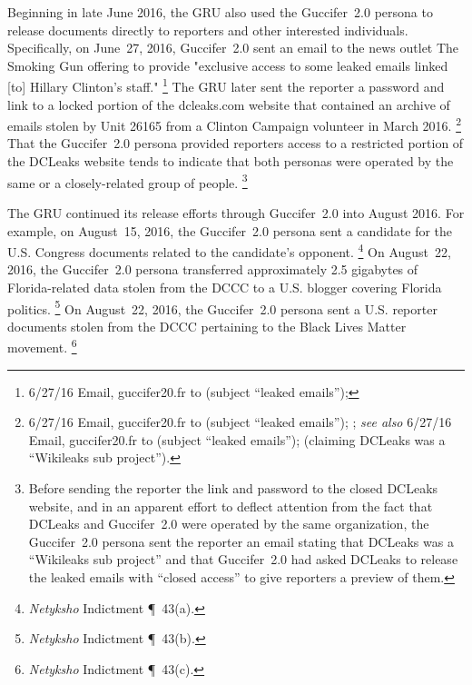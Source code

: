 Beginning in late June 2016, the GRU also used the Guccifer~2.0 persona to release documents directly to reporters and other interested individuals.
Specifically, on June~27, 2016, Guccifer~2.0 sent an email to the news outlet The Smoking Gun offering to provide "exclusive access to some leaked emails linked [to] Hillary Clinton's staff."%
\footnote{6/27/16 Email, guccifer20\@aol.fr to  (subject ``leaked emails''); }
The GRU later sent the reporter a password and link to a locked portion of the dcleaks.com website that contained an archive of emails stolen by Unit 26165 from a Clinton Campaign volunteer in March 2016.%
\footnote{6/27/16 Email, guccifer20\@aol.fr to  (subject ``leaked emails''); ;
\textit{see also} 6/27/16 Email, guccifer20\@aol.fr to  (subject ``leaked emails'');  (claiming DCLeaks was a ``Wikileaks sub project'').}
That the Guccifer~2.0 persona provided reporters access to a restricted portion of the DCLeaks website tends to indicate that both personas were operated by the same or a  closely-related group of people.%
\footnote{Before sending the reporter the link and password to the closed DCLeaks website, and in an apparent effort to deflect attention from the fact that DCLeaks and Guccifer~2.0 were operated by the same organization, the Guccifer~2.0 persona sent the reporter an email stating that DCLeaks was a ``Wikileaks sub project'' and that Guccifer~2.0 had asked DCLeaks to release the leaked emails with ``closed access'' to give reporters a preview of them.
}

The GRU continued its release efforts through Guccifer~2.0 into August 2016.
For example, on August~15, 2016, the Guccifer~2.0 persona sent a candidate for the U.S. Congress documents related to the candidate's opponent.%
\footnote{\textit{Netyksho} Indictment \P~43(a).}
On August~22, 2016, the Guccifer~2.0 persona transferred approximately 2.5 gigabytes of Florida-related data stolen from the DCCC to a U.S. blogger covering Florida politics.%
\footnote{\textit{Netyksho} Indictment \P~43(b).}
On August~22, 2016, the Guccifer~2.0 persona sent a U.S. reporter documents stolen from the DCCC pertaining to the Black Lives Matter movement.%
\footnote{\textit{Netyksho} Indictment \P~43(c).}

